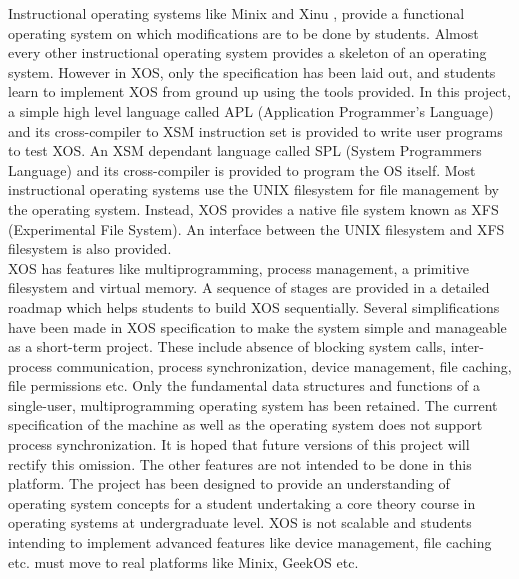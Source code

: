 \documentclass{sig-alternate}
\begin{document}
 
Instructional operating systems like Minix and Xinu \cite{survey}, provide a functional operating system on which modifications are to be done by students. Almost every other instructional operating system provides a skeleton of an operating system. However in XOS, only the specification has been laid out, and students learn to implement XOS from ground up using the tools provided. In this project, a simple high level language called APL (Application Programmer's Language) and its cross-compiler to XSM instruction set is provided to write user programs to test XOS. An XSM dependant language called SPL (System Programmers Language) and its cross-compiler is provided to program the OS itself. Most instructional operating systems use the UNIX filesystem for file management by the operating system. Instead, XOS provides a native file system known as XFS (Experimental File System). An interface between the UNIX filesystem and XFS filesystem is also provided.  \\

XOS has features like multiprogramming, process management, a primitive  filesystem and virtual memory. A sequence of stages are provided in a detailed roadmap which helps students to build XOS sequentially. Several simplifications have been made in XOS specification to make the system simple and manageable as a short-term project. These include absence of blocking system calls, inter-process communication, process synchronization, device management, file caching, file permissions etc.  Only the fundamental data structures and functions of a single-user, multiprogramming operating system has been retained. The current specification of the machine as well as the operating system does not support process synchronization. It is hoped that future versions of this project will rectify this omission. The other features are not intended to be done in this platform. The project has been designed to provide an understanding of operating system concepts for a student undertaking a core theory course in  operating systems at undergraduate level. XOS is not scalable and students intending to implement advanced features like device management, file caching etc. must move to real platforms like Minix, GeekOS\cite{survey} etc. \\
\end{document}
